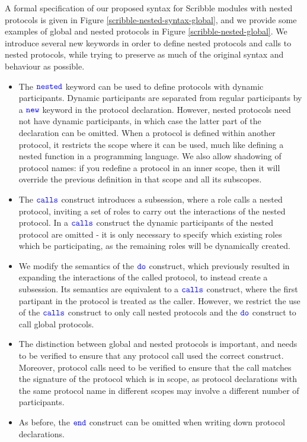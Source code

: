 \documentclass[12pt,twoside]{report}
\begin{document}
A formal specification of our proposed syntax for Scribble modules with nested protocols is given in Figure \ref{scribble-nested-syntax-global}, and we provide some examples of global and nested protocols in Figure \ref{scribble-nested-global}. We introduce several new keywords in order to define nested protocols and calls to nested protocols, while trying to preserve as much of the original syntax and behaviour as possible.
\begin{itemize}
    \item The ${\color{blue}\mathtt{nested}}$ keyword can be used to define protocols with dynamic participants. Dynamic participants are separated from regular participants by a ${\color{blue}\mathtt{new}}$ keyword in the protocol declaration. However, nested protocols need not have dynamic participants, in which case the latter part of the declaration can be omitted. When a protocol is defined within another protocol, it restricts the scope where it can be used, much like defining a nested function in a programming language. We also allow shadowing of protocol names: if you redefine a protocol in an inner scope, then it will override the previous definition in that scope and all its subscopes.
    \item The ${\color{blue}\mathtt{calls}}$ construct introduces a subsession, where a role calls a nested protocol, inviting a set of roles to carry out the interactions of the nested protocol. In a ${\color{blue}\mathtt{calls}}$ construct the dynamic participants of the nested protocol are omitted - it is only necessary to specify which existing roles which be participating, as the remaining roles will be dynamically created.
    \item We modify the semantics of the ${\color{blue}\mathtt{do}}$ construct, which previously resulted in expanding the interactions of the called protocol, to instead create a subsession. Its semantics are equivalent to a ${\color{blue}\mathtt{calls}}$ construct, where the first partipant in the protocol is treated as the caller. However, we restrict the use of the ${\color{blue}\mathtt{calls}}$ construct to only call nested protocols and the ${\color{blue}\mathtt{do}}$ construct to call global protocols. 
    \item The distinction between global and nested protocols is important, and needs to be verified to ensure that any protocol call used the correct construct. Moreover, protocol calls need to be verified to ensure that the call matches the signature of the protocol which is in scope, as protocol declarations with the same protocol name in different scopes may involve a different number of participants.
    \item As before, the ${\color{blue}\mathtt{end}}$ construct can be omitted when writing down protocol declarations.
\end{itemize}
\end{document}
